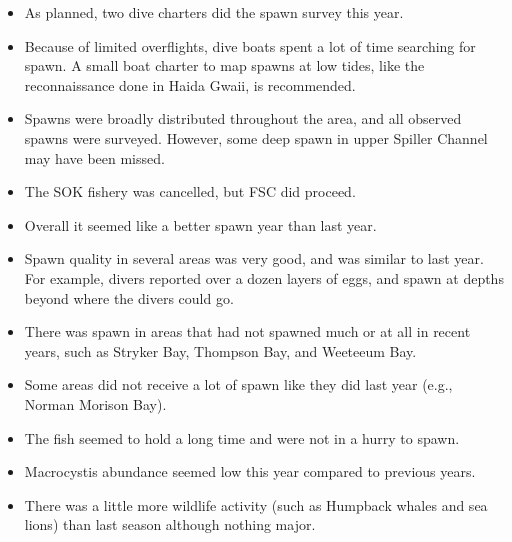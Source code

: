 \begin{itemize}

\item As planned, two dive charters did the spawn survey this year.

\item Because of limited overflights, dive boats spent a lot of time searching for spawn.
A small boat charter to map spawns at low tides, like the reconnaissance done in Haida Gwaii, is recommended.

\item Spawns were broadly distributed throughout the area, and all observed spawns were surveyed.
However, some deep spawn in upper Spiller Channel may have been missed.

\item The SOK fishery was cancelled, but FSC did proceed.

\item Overall it seemed like a better spawn year than last year.

\item Spawn quality in several areas was very good, and was similar to last year.
For example, divers reported over a dozen layers of eggs, and spawn at depths beyond where the divers could go.

\item There was spawn in areas that had not spawned much or at all in recent years, such as Stryker Bay, Thompson Bay, and Weeteeum Bay.

\item Some areas did not receive a lot of spawn like they did last year (e.g., Norman Morison Bay).

\item The fish seemed to hold a long time and were not in a hurry to spawn.

\item Macrocystis abundance seemed low this year compared to previous years.

\item There was a little more wildlife activity (such as Humpback whales and sea lions) than last season although nothing major.

\end{itemize}
